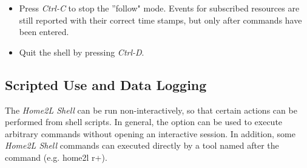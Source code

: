 \documentclass[12pt,english,parskip=half,headheight=19pt]{scrreprt}
\newcommand{\lst}[1]{\colorbox{lstbackground}{\footnotesize\code{#1}}}
\newcommand{\lstf}[1]{\colorbox{lstbackground}{\ttfamily\footnotesize#1}}
\begin{document}
\begin{itemize}[$\blacktriangleright$]
\item
  Press \textit{Ctrl-C} to stop the ''follow" mode. Events for subscribed resources
  are still reported with their correct time stamps, but only after
  commands have been entered.

\item
  Quit the shell by pressing \textit{Ctrl-D}.

\end{itemize}





\subsection{Scripted Use and Data Logging}
\label{sec:tutorial-shell-scripting}


The \textit{Home2L Shell} can be run non-interactively, so that certain actions can be performed from shell scripts. In general, the \lst{-e} option can be used to execute arbitrary commands without opening an interactive session. In addition, some \textit{Home2L Shell} commands can executed directly by a tool named after the command (e.g. \lstf{home2l r+}).
\end{document}
